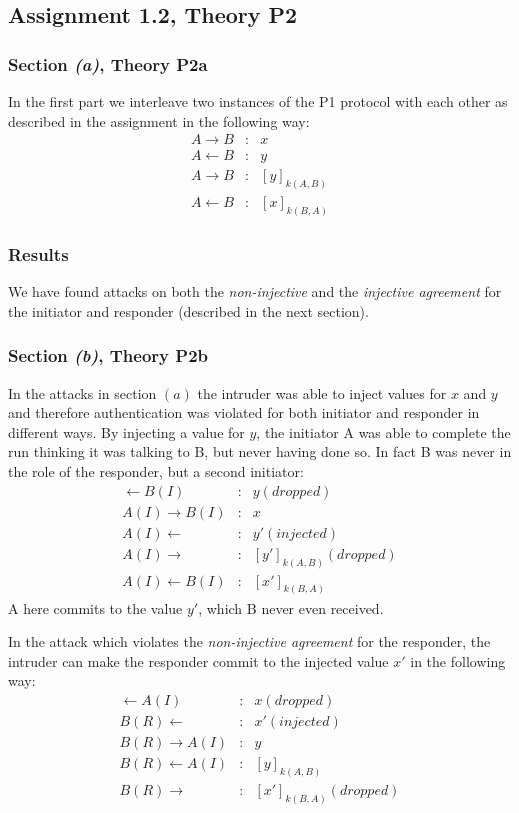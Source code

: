 \documentclass[a4paper]{article}
\begin{document}
\subsection{Assignment 1.2, Theory P2}
\subsubsection{Section {\it\bf (a)}, Theory P2a}
In the first part we interleave two instances of the P1 protocol with each other as described in the assignment in the following way:
\begin{eqnarray*}
A \to B        & : & x\\
A \leftarrow B & : & y\\
A \to B        & : & [y]_{k(A,B)}\\
A \leftarrow B & : & [x]_{k(B,A)} 
\end{eqnarray*}

\subsubsection*{Results}
We have found attacks on both the {\em non-injective} and the {\em injective agreement} for the initiator and responder (described in the next section).

\subsubsection{Section {\it\bf (b)}, Theory P2b}
In the attacks in section $(a)$ the intruder was able to inject values for $x$ and $y$ and therefore authentication was violated for both initiator and responder in different ways. By injecting a value for $y$, the initiator A was able to complete the run thinking it was talking to B, but never having done so. In fact B was never in the role of the responder, but a second initiator:
\begin{eqnarray*}
       \leftarrow B(I) & : & y ({dropped})\\
A(I) \to            B(I) & : & x\\
A(I) \leftarrow        & : & y' ({injected})\\
A(I) \to                   & : & [y']_{k(A,B)} ({dropped})\\
A(I) \leftarrow B(I) & : & [x']_{k(B,A)}
\end{eqnarray*}
A here commits to the value $y'$, which B never even received. \par \noindent

In the attack which violates the {\em non-injective agreement} for the responder, the intruder can make the responder commit to the injected value $x'$ in the following way:
\begin{eqnarray*}
        \leftarrow A(I)  & : & x ({dropped})\\
B(R) \leftarrow        & : & x' ({injected})\\
B(R) \to            A(I) & : & y\\
B(R) \leftarrow A(I) & : & [y]_{k(A,B)}\\
B(R) \to                  & : & [x']_{k(B,A)} ({dropped})
\end{eqnarray*}
\end{document}
